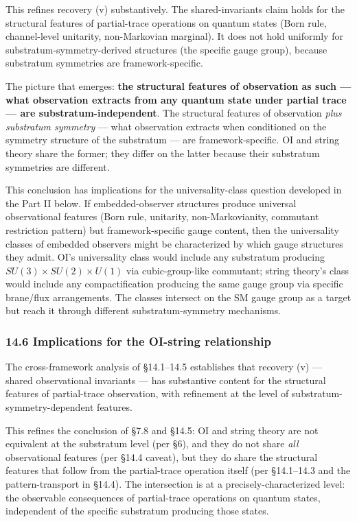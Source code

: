 \documentclass[
]{article}
\begin{document}
This refines recovery (v) substantively. The shared-invariants claim
holds for the structural features of partial-trace operations on quantum
states (Born rule, channel-level unitarity, non-Markovian marginal). It
does not hold uniformly for substratum-symmetry-derived structures (the
specific gauge group), because substratum symmetries are
framework-specific.

The picture that emerges: \textbf{the structural features of observation
as such --- what observation extracts from any quantum state under
partial trace --- are substratum-independent}. The structural features
of observation \emph{plus substratum symmetry} --- what observation
extracts when conditioned on the symmetry structure of the substratum
--- are framework-specific. OI and string theory share the former; they
differ on the latter because their substratum symmetries are different.

This conclusion has implications for the universality-class question
developed in the Part II below. If embedded-observer structures produce
universal observational features (Born rule, unitarity,
non-Markovianity, commutant restriction pattern) but framework-specific
gauge content, then the universality classes of embedded observers might
be characterized by which gauge structures they admit. OI's universality
class would include any substratum producing
\(SU(3) \times SU(2) \times U(1)\) via cubic-group-like commutant;
string theory's class would include any compactification producing the
same gauge group via specific brane/flux arrangements. The classes
intersect on the SM gauge group as a target but reach it through
different substratum-symmetry mechanisms.

\hypertarget{implications-for-the-oi-string-relationship}{%
\subsubsection{14.6 Implications for the OI-string
relationship}\label{implications-for-the-oi-string-relationship}}

The cross-framework analysis of §14.1--14.5 establishes that recovery
(v) --- shared observational invariants --- has substantive content for
the structural features of partial-trace observation, with refinement at
the level of substratum-symmetry-dependent features.

This refines the conclusion of §7.8 and §14.5: OI and string theory are
not equivalent at the substratum level (per §6), and they do not share
\emph{all} observational features (per §14.4 caveat), but they do share
the structural features that follow from the partial-trace operation
itself (per §14.1--14.3 and the pattern-transport in §14.4). The
intersection is at a precisely-characterized level: the observable
consequences of partial-trace operations on quantum states, independent
of the specific substratum producing those states.
\end{document}
